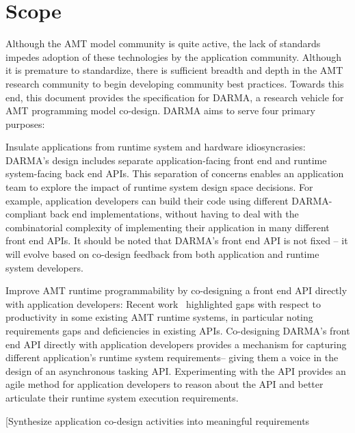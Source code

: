 \section{Scope}\label{sec:scope}
Although the \gls{AMT} model community is quite active, the lack of
standards impedes adoption of these technologies by the application community.
Although it is premature to standardize, there is sufficient  
breadth and depth in the \gls{AMT} research community to begin developing community best
practices.  Towards this end, this document provides the specification for \gls{DARMA},
a research vehicle for \gls{AMT} \gls{programming model} \gls{co-design}.  
\gls{DARMA} aims to serve four primary purposes:
\begin{compactdesc}
\item[Insulate applications from runtime system and hardware idiosyncrasies:]
  \gls{DARMA}'s design includes separate application-facing \gls{front end} and
  \gls{runtime system}-facing \gls{back end} \glspl{API}. This separation of concerns 
  enables an application team to explore the impact of \gls{runtime system}
  design space decisions. For example, application developers can build their code using different
  \gls{DARMA}-compliant \gls{back end} implementations, without
  having to deal with the combinatorial complexity of
  implementing their application in many different \gls{front end} \glspl{API}. 
  It should be noted that \gls{DARMA}'s \gls{front end} \gls{API} is not
  fixed -- it will evolve based on \gls{co-design} feedback from both application
  and \gls{runtime system} developers. 
\item[Improve AMT runtime programmability by co-designing a front end  API directly with application developers:]
  Recent work~\cite{L2Sand2015} highlighted gaps with respect to productivity
  in some existing \gls{AMT} \glspl{runtime system}, in particular noting requirements gaps and 
  deficiencies in existing \glspl{API}. Co-designing \gls{DARMA}'s \gls{front end} \gls{API}
  directly with application developers provides a mechanism for capturing
  different application's \gls{runtime system} requirements-- giving them a voice in the design of an
  asynchronous tasking \gls{API}.  Experimenting with the \gls{API} provides an agile method for application
  developers to reason about the \gls{API} 
  and better articulate their \gls{runtime system} execution requirements.
\item[Synthesize application co-design activities into meaningful requirements

\end{compactdesc}
